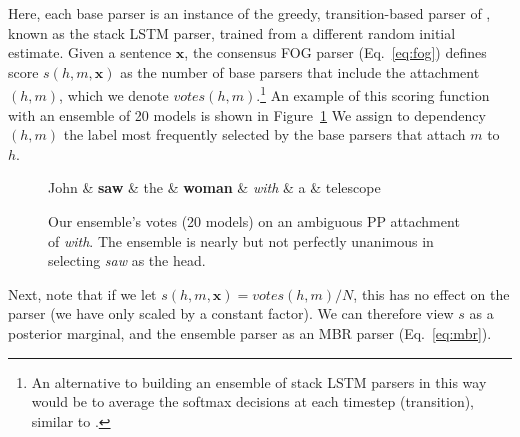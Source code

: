 \documentclass[11pt,letterpaper]{article}
\newcommand{\ignore}[1]{}
\newcommand{\adhicomment}[1]{\ignore{\textcolor{green}{{\textbf{[#1 --\textsc{adhi}]}}}}}
\newcommand{\cjd}[1]{\textcolor{cyan}{\ignore{{\textbf{[#1 --\textsc{cjd}]}}}}}
\newcommand{\nascomment}[1]{\ignore{\textcolor{blue}{{\textbf{[#1 --\textsc{nas}]}}}}}
\begin{document}
Here, each base parser is an instance of the greedy, transition-based parser of , known as the stack LSTM parser, trained from a different random initial estimate.  Given a sentence $\boldsymbol{x}$, the consensus FOG parser (Eq.~\ref{eq:fog}) defines  score $s(h, m, \boldsymbol{x})$ as the number
of base parsers that include the attachment $(h, m)$, which we denote $\mathit{votes}(h,m)$.\footnote{An alternative to building an ensemble of stack LSTM parsers in this way would be to average the softmax decisions at each timestep (transition), similar to . \ignore{\cjd{they didn't do dep parsing, but they did it in this paper}  Our approach is simpler to implement and more memory-efficient, since each parser can be run sequentially.  Further, voting on each attachment is more amenable to the distillation we will explore in \S\ref{sec:distillation}. \nascomment{Chris wanted us to make this clear; I think it would be good to cite the kind of ensemble he suggests is an alternative, but I'm not sure what the citation would be}\adhicomment{I'm not aware of any works that did that.}}} An example of this scoring function with an ensemble of 20 models is shown in Figure~\ref{ensembling_figure} We assign to dependency $(h, m)$ the label most frequently selected by the base parsers that attach $m$ to $h$.



\begin{figure}
\begin{dependency}
  \centering
  \begin{deptext}
  John \& \textbf{saw} \& the \& \textbf{woman} \& \emph{with} \& a \& telescope\\
  \end{deptext}
     \end{dependency}
     \caption{Our ensemble's votes (20 models) on an ambiguous PP attachment of \emph{with}. \ignore{\nascomment{I took out the 0 to John; why show that when there's also 0 to the, with, a, and telescope? also switched arrow direction}}The ensemble is nearly but not perfectly unanimous in selecting \emph{saw} as the head.}
     \label{ensembling_figure}
 \end{figure}



Next, note that if we let $s(h,m, \boldsymbol{x}) = \mathit{votes}(h,m)/N$, this has no effect on the parser (we have only scaled by a constant factor).  We can therefore view $s$ as a posterior marginal, and the ensemble parser as an MBR parser (Eq.~\ref{eq:mbr}).   
\end{document}
